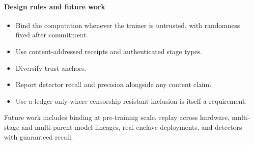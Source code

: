 \documentclass[journal,10pt]{IEEEtran}
\theoremstyle{definition}
\begin{document}
\paragraph{Design rules and future work}
\begin{itemize}
\item Bind the computation whenever the trainer is untrusted, with randomness fixed after
  commitment.
\item Use content-addressed receipts and authenticated stage types.
\item Diversify trust anchors.
\item Report detector recall and precision alongside any content claim.
\item Use a ledger only where censorship-resistant inclusion is itself a requirement.
\end{itemize}
Future work includes binding at pre-training scale, replay across hardware, multi-stage and
multi-parent model lineages, real enclave deployments, and detectors with guaranteed recall.




\appendices

\end{document}
